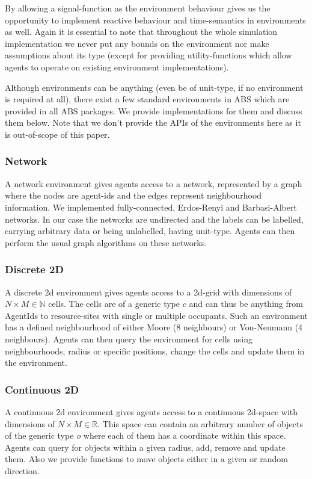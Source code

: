 By allowing a signal-function as the environment behaviour gives us the opportunity to implement reactive behaviour and time-semantics in environments as well. Again it is essential to note that throughout the whole simulation implementation we never put any bounds on the environment nor make assumptions about its type (except for providing utility-functions which allow agents to operate on existing environment implementations).

Although environments can be anything (even be of unit-type, if no environment is required at all), there exist a few standard environments in ABS which are provided in all ABS packages. We provide implementations for them and discuss them below. Note that we don't provide the APIs of the environments here as it is out-of-scope of this paper.

\subsubsection{Network}
A network environment gives agents access to a network, represented by a graph where the nodes are agent-ids and the edges represent neighbourhood information. We implemented fully-connected, Erdos-Renyi and Barbasi-Albert networks. In our case the networks are undirected and the labels can be labelled, carrying arbitrary data or being unlabelled, having unit-type. Agents can then perform the usual graph algorithms on these networks. 

\subsubsection{Discrete 2D}
A discrete 2d environment gives agents access to a 2d-grid with dimensions of $N \times M \in \mathbb{N}$ cells. The cells are of a generic type $c$ and can thus be anything from AgentIds to resource-sites with single or multiple occupants. Such an environment has a defined neighbourhood of either Moore (8 neighbours) or Von-Neumann (4 neighbours). Agents can then query the environment for cells using neighbourhoods, radius or specific positions, change the cells and update them in the environment.

\subsubsection{Continuous 2D}
A continuous 2d environment gives agents access to a continuous 2d-space with dimensions of $N \times M \in \mathbb{R}$. This space can contain an arbitrary number of objects of the generic type \textit{o} where each of them has a coordinate within this space. Agents can query for objects within a given radius, add, remove and update them. Also we provide functions to move objects either in a given or random direction.

